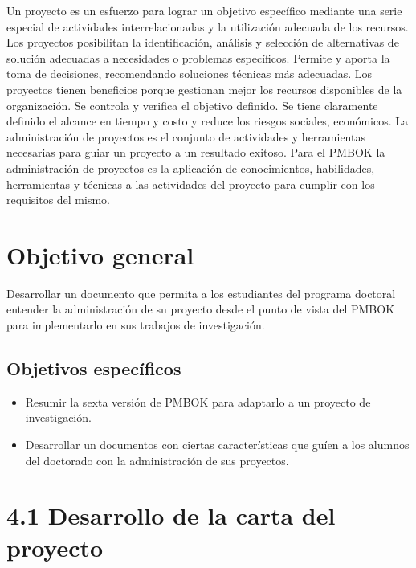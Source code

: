 \documentclass[letterpaper,12pt,openright,oneside]{article}
\theoremstyle{plain}
\begin{document}
Un proyecto es un esfuerzo para lograr un objetivo específico mediante una serie especial de actividades interrelacionadas y la utilización adecuada de los recursos.
Los proyectos posibilitan la identificación, análisis y selección de alternativas de solución adecuadas a necesidades o problemas específicos.
Permite y aporta la toma de decisiones, recomendando soluciones técnicas más adecuadas.
Los proyectos tienen beneficios porque gestionan mejor los recursos disponibles de la organización.
Se controla y verifica el objetivo definido.
Se tiene claramente definido el alcance en tiempo y costo y reduce los riesgos sociales, económicos.
La administración de proyectos es el conjunto de actividades y herramientas necesarias para guiar un proyecto a un resultado exitoso.
Para el PMBOK la administración de proyectos es la aplicación de conocimientos, habilidades, herramientas y técnicas a las actividades del proyecto para cumplir con los requisitos del mismo.
% 
% 

\section{Objetivo general}

Desarrollar un documento que permita a los estudiantes del programa doctoral entender la administración de su proyecto desde el punto de vista del PMBOK para implementarlo en sus trabajos de investigación. 
% 
%
\subsection{Objetivos específicos}

\begin{itemize}
    \item Resumir la sexta versión de PMBOK para adaptarlo a un proyecto de investigación.
    \item Desarrollar un documentos con ciertas características que guíen a los alumnos del doctorado con la administración de sus proyectos.
\end{itemize}

\section*{4.1 Desarrollo de la carta del proyecto}
\end{document}
